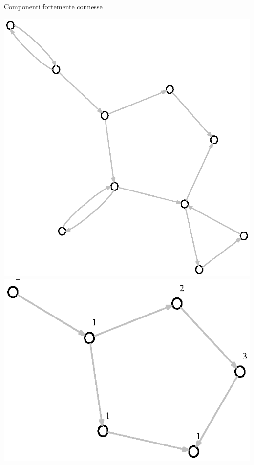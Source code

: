 \documentclass{beamer}
\begin{document}
\begin{frame}{Componenti fortemente connesse}
\begin{center} 
  \includegraphics[scale=.4]{images/presentation-input-graph-all-whites.eps}
  \includegraphics[scale=.6]{images/presentation-scc-metagraph-all-whites.eps}
\end{center}
\end{frame}
\end{document}
